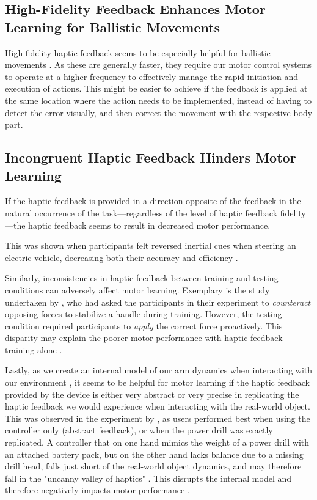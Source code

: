 \subsection{High-Fidelity Feedback Enhances Motor Learning for Ballistic Movements}

High-fidelity haptic feedback seems to be especially helpful for ballistic movements \cite{Wall2000}. As these are generally faster, they require our motor control systems to operate at a higher frequency to effectively manage the rapid initiation and execution of actions. This might be easier to achieve if the feedback is applied at the same location where the action needs to be implemented, instead of having to detect the error visually, and then correct the movement with the respective body part. 


\subsection{Incongruent Haptic Feedback Hinders Motor Learning}
If the haptic feedback is provided in a direction opposite of the feedback in the natural occurrence of the task---regardless of the level of haptic feedback fidelity---the haptic feedback seems to result in decreased motor performance. 

This was shown when participants felt reversed inertial cues when steering an electric vehicle, decreasing both their accuracy and efficiency \cite{Macuga2019}. 

Similarly, inconsistencies in haptic feedback between training and testing conditions can adversely affect motor learning. Exemplary is the study undertaken by \cite{Morris2007}, who had asked the participants in their experiment to \textit{counteract} opposing forces to stabilize a handle during training. However, the testing condition required participants to \textit{apply} the correct force proactively. This disparity may explain the poorer motor performance with haptic feedback training alone \cite{Morris2007}.

Lastly, as we create an internal model of our arm dynamics when interacting with our environment \cite{Pierella2019TheModels}, it seems to be helpful for motor learning if the haptic feedback provided by the device is either very abstract or very precise in replicating the haptic feedback we would experience when interacting with the real-world object. This was observed in the experiment by \cite{Yang2023}, as users performed best when using the controller only (abstract feedback), or when the power drill was exactly replicated. A controller that on one hand mimics the weight of a power drill with an attached battery pack, but on the other hand lacks balance due to a missing drill head, falls just short of the real-world object dynamics, and may therefore fall in the "uncanny valley of haptics" \cite{Berger2018TheHaptics}. This disrupts the internal model and therefore negatively impacts motor performance \cite{Yang2023}. 


